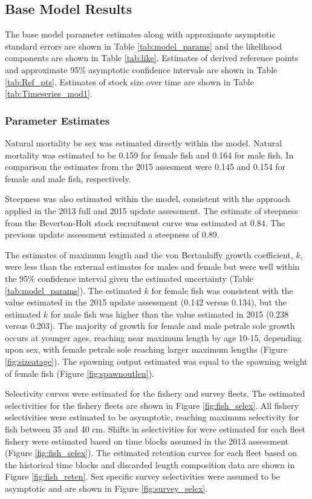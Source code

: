\documentclass[12pt,]{article}
\begin{document}
\subsection{Base Model Results}\label{base-model-results}

The base model parameter estimates along with approximate asymptotic
standard errors are shown in Table \ref{tab:model_params} and the
likelihood components are shown in Table \ref{tab:like}. Estimates of
derived reference points and approximate 95\% asymptotic confidence
intervals are shown in Table \ref{tab:Ref_pts}. Estimates of stock size
over time are shown in Table \ref{tab:Timeseries_mod1}.

\subsubsection{Parameter Estimates}\label{parameter-estimates}

Natural mortality be sex was estimated directly within the model.
Natural mortality was estimated to be 0.159 for female fish and 0.164
for male fish. In comparison the estimates from the 2015 assesment were
0.145 and 0.154 for female and male fish, respectively.

Steepness was also estimated within the model, consistent with the
approach applied in the 2013 full and 2015 update assessment. The
estimate of steepness from the Beverton-Holt stock recruitment curve was
estimated at 0.84. The previous update assessment estimated a steepness
of 0.89.

The estimates of maximum length and the von Bertanlaffy growth
coefficient, \(k\), were less than the external estimates for males and
female but were well within the 95\% confidence interval given the
estimated uncertainty (Table \ref{tab:model_params}). The estimated
\(k\) for female fish was consistent with the value estimated in the
2015 update assessment (0.142 versus 0.134), but the estimated \(k\) for
male fish was higher than the value estimated in 2015 (0.238 versus
0.203). The majority of growth for female and male petrale sole growth
occurs at younger ages, reaching near maximum length by age 10-15,
depending upon sex, with female petrale sole reaching larger maximum
lengths (Figure \ref{fig:sizeatage}). The spawning output estimated was
equal to the spawning weight of female fish (Figure
\ref{fig:spawnoutlen}).

Selectivity curves were estimated for the fishery and survey fleets. The
estimated selectivities for the fishery fleets are shown in Figure
\ref{fig:fish_selex}. All fishery selectivities were estimated to be
asymptotic, reaching maximum selectivity for fish between 35 and 40 cm.
Shifts in selectivities for were estimated for each fleet fishery were
estimated based on time blocks assumed in the 2013 assessment (Figure
\ref{fig:fish_selex}). The estimated retention curves for each fleet
based on the historical time blocks and discarded length composition
data are shown in Figure \ref{fig:fish_reten}. Sex specific survey
selectivities were assumed to be asymptotic and are shown in Figure
\ref{fig:survey_selex}.
\end{document}

